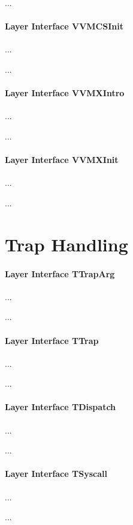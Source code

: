 ...

\paragraph{Layer Interface VVMCSInit}
...

...

\paragraph{Layer Interface VVMXIntro}
...

...

\paragraph{Layer Interface VVMXInit}
...

...

\section{Trap Handling}

\paragraph{Layer Interface TTrapArg}
...

...

\paragraph{Layer Interface TTrap}
...

...

\paragraph{Layer Interface TDispatch}
...

...

\paragraph{Layer Interface TSyscall}
...

...